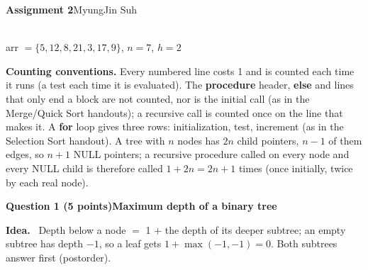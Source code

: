 \documentclass[10pt]{article}
\makeatletter
\newcounter{qnum}
\newif\iffirstrow
\newcommand{\qhead}[3]{\par\vspace{5pt}\stepcounter{qnum}\global\firstrowtrue
  \@ifundefined{qrowh@\theqnum}{\Needspace{12\baselineskip}}{\Needspace{\dimexpr\csname qrowh@\theqnum\endcsname+7\baselineskip\relax}}%
  \noindent\colorbox{barc}{\parbox{\dimexpr\linewidth-2\fboxsep}{\bfseries\color{headc}Question #1 (#2 points)\quad #3}}\par\vspace{1pt}}
\newcommand{\pt}[1]{{\bfseries\color{headc}#1}\ }
\makeatother
\begin{document}
{\large\bfseries Assignment 2}\hfill MyungJin Suh 

\vspace{2pt}
\noindent\begin{minipage}[c]{0.2\linewidth}\centering
{}\\[-1pt]{\scriptsize arr $=\{5,12,8,21,3,17,9\}$, $n=7$, $h=2$}
\end{minipage}\hfill
\begin{minipage}[c]{0.78\linewidth}\footnotesize
\textbf{Counting conventions.} Every numbered line costs 1 and is counted each time it runs (a test each time it is evaluated). The \textbf{procedure} header, \textbf{else} and lines that only end a block are not counted, nor is the initial call (as in the Merge/Quick Sort handouts); a recursive call is counted once on the line that makes it. A \textbf{for} loop gives three rows: initialization, test, increment (as in the Selection Sort handout). A tree with $n$ nodes has $2n$ child pointers, $n-1$ of them edges, so $n+1$ NULL pointers; a recursive procedure called on every node and every NULL child is therefore called $1+2n = 2n+1$ times (once initially, twice by each real node).
\end{minipage}

\qhead{1}{5}{Maximum depth of a binary tree}
\pt{Idea.} Depth below a node $=$ 1 $+$ the depth of its deeper subtree; an empty subtree has depth $-1$, so a leaf gets $1+\max(-1,-1)=0$. Both subtrees answer first (postorder).
\end{document}
